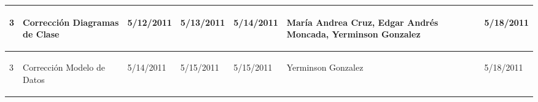 \begin{center}
\begin{longtable}{|p{}|p{}|p{}|p{}|p{}|p{}|p{}|p{}|}
{\begin{center} 3 \end{center}} & 
{\begin{center} Corrección Diagramas de Clase \end{center}} & 
{\begin{center} 5/12/2011 \end{center}} & 
{\begin{center} 5/13/2011 \end{center}} & 
{\begin{center} 5/14/2011 \end{center}} & 
{\begin{center} María Andrea Cruz, Edgar Andrés Moncada, Yerminson Gonzalez \end{center}} & 
{\begin{center}  \end{center}} & 
{\begin{center} 5/18/2011 \end{center}}\\
\hline

{\begin{center} 3 \end{center}} & 
{\begin{center} Corrección Modelo de Datos \end{center}} & 
{\begin{center} 5/14/2011 \end{center}} & 
{\begin{center} 5/15/2011 \end{center}} & 
{\begin{center} 5/15/2011 \end{center}} & 
{\begin{center} Yerminson Gonzalez \end{center}} & 
{\begin{center}  \end{center}} & 
{\begin{center} 5/18/2011 \end{center}}\\
\hline


\end{longtable}
\end{center}
